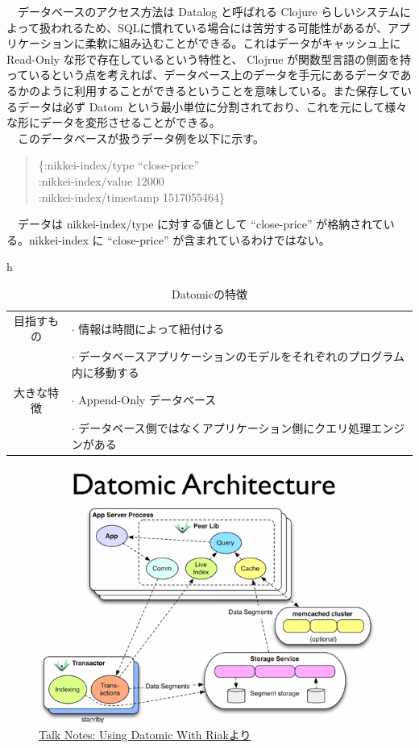 \documentclass{scrartcl}
\begin{document}
　データベースのアクセス方法は Datalog と呼ばれる Clojure らしいシステムによって扱われるため、SQLに慣れている場合には苦労する可能性があるが、アプリケーションに柔軟に組み込むことができる。これはデータがキャッシュ上に Read-Only な形で存在しているという特性と、 Clojrue が関数型言語の側面を持っているという点を考えれば、データベース上のデータを手元にあるデータであるかのように利用することができるということを意味している。また保存しているデータは必ず Datom という最小単位に分割されており、これを元にして様々な形にデータを変形させることができる。\\
　このデータベースが扱うデータ例を以下に示す。\\

\begin{verse}
\{:nikkei-index/type ``close-price''\\
\hspace*{1em}:nikkei-index/value 12000\\
\hspace*{1em}:nikkei-index/timestamp 1517055464\}\\
\end{verse}
　データは nikkei-index/type に対する値として ``close-price'' が格納されている。nikkei-index に ``close-price'' が含まれているわけではない。\\

\begin{table}{h}
\caption{Datomicの特徴}
\centering
\begin{tabular}{|c|l|}
\hline
目指すもの & \(\cdot\) 情報は時間によって紐付ける\\
 & \(\cdot\) データベースアプリケーションのモデルをそれぞれのプログラム内に移動する\\
\hline
大きな特徴 & \(\cdot\) Append-Only データベース\\
 & \(\cdot\) データベース側ではなくアプリケーション側にクエリ処理エンジンがある\\
\hline
\end{tabular}
\end{table}

\begin{figure}[htbp]
\centering
\includegraphics[width=15cm]{./datomic.png}
\caption{\href{http://endot.org/notes/2014-01-10-using-datomic-with-riak/datomic.png}{Talk Notes: Using Datomic With Riakより}}
\end{figure}
\end{document}
